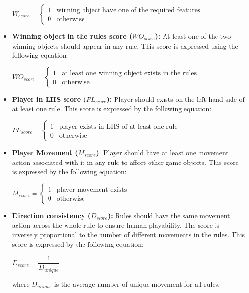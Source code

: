 \begin{itemize}
\begin{center}
	$W_{score}= \begin{cases}
	               1 & \text{winning object have one of the required features}\\
	               0 & \text{otherwise}
	           \end{cases}$
	\end{center}	
	\item \textbf{Winning object in the rules score ($WO_{score}$):} At least one of the two winning objects should appear in any rule. This score is expressed using the following equation:
	\begin{center}
	$WO_{score}= \begin{cases}
	               1 & \text{at least one winning object exists in the rules}\\
	               0 & \text{otherwise}
	           \end{cases}$
	\end{center}
	\item \textbf{Player in LHS score ($PL_{score}$):} Player should exists on the left hand side of at least one rule. This score is expressed by the following equation:
	\begin{center}
	$PL_{score}= \begin{cases}
	               1 & \text{player exists in LHS of at least one rule}\\
	               0 & \text{otherwise}
	           \end{cases}$
	\end{center}	
	\item \textbf{Player Movement ($M_{score}$):} Player should have at least one movement action associated with it in any rule to affect other game objects. This score is expressed by the following equation:
	\begin{center}
	$M_{score}= \begin{cases}
	               1 & \text{player movement exists}\\
	               0 & \text{otherwise}
	           \end{cases}$
	\end{center}	
	\item \textbf{Direction consistency ($D_{score}$):} Rules should have the same movement action across the whole rule to ensure human playability. The score is inversely proportional to the number of different movements in the rules. This score is expressed by the following equation:
	\begin{center}
	$D_{score} = \dfrac{1}{D_{unique}}$
	\end{center}
	where $D_{unique}$ is the average number of unique movement for all rules.
\end{itemize}
